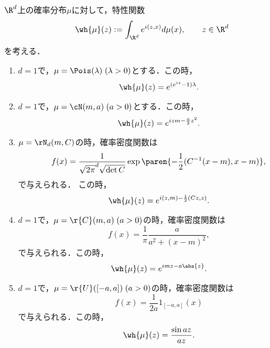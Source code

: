 \documentclass[uplatex,dvipdfmx]{jsarticle}
\begin{document}
\begin{problem*}[32]
    $\R^d$上の確率分布$\mu$に対して，特性関数
    \[\wh{\mu}(z):=\int_{\R^d}e^{i(z,x)}d\mu(x),\qquad z\in\R^d\]
    を考える．
    \begin{enumerate}
        \item $d=1$で，$\mu=\Pois(\lambda)\;(\lambda>0)$とする．この時，
        \[\wh{\mu}(z)=e^{(e^{iz}-1)\lambda}.\]
        \item $d=1$で，$\mu=\cN(m,a)\;(a>0)$とする．この時，
        \[\wh{\mu}(z)=e^{izm-\frac{a}{2}z^2}.\]
        \item $\mu=\rN_d(m,C)$の時，確率密度関数は
        \[f(x)=\frac{1}{\sqrt{2\pi}^d\sqrt{\det C}}\exp\paren{-\frac{1}{2}(C^{-1}(x-m),x-m)},\]
        で与えられる．
        この時，
        \[\wh{\mu}(z)=e^{i(z,m)-\frac{1}{2}(Cz,z)}.\]
        \item $d=1$で，$\mu=\r{C}(m,a)\;(a>0)$の時，確率密度関数は
        \[f(x)=\frac{1}{\pi}\frac{a}{a^2+(x-m)^2},\]
        で与えられる．この時，
        \[\wh{\mu}(z)=e^{imz-a\abs{z}}.\]
        \item $d=1$で，$\mu=\r{U}([-a,a])\;(a>0)$の時，確率密度関数は
        \[f(x)=\frac{1}{2a}1_{[-a,a]}(x)\]
        で与えられる．この時，
        \[\wh{\mu}(z)=\frac{\sin az}{az}.\]
    \end{enumerate}
\end{problem*}
\end{document}
